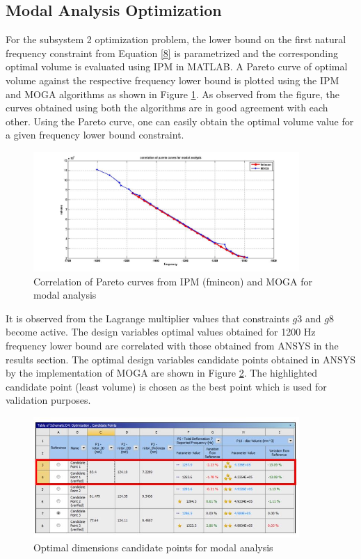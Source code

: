 \documentclass[12pt]{article}
\begin{document}
\subsection{Modal Analysis Optimization}
For the subsystem 2 optimization problem, the lower bound on the first natural frequency constraint from Equation \ref{8} is parametrized and the corresponding optimal volume is evaluated using IPM in MATLAB. A Pareto curve of optimal volume against the respective frequency lower bound is plotted using the IPM and MOGA algorithms as shown in Figure \ref{fig3}. As observed from the figure, the curves obtained using both the algorithms are in good agreement with each other. Using the Pareto curve, one can easily obtain the optimal volume value for a given frequency lower bound constraint. 
\begin{figure}[H]
\begin{center}
\includegraphics[width=0.9\textwidth]{modal_pareto.jpg}
\caption{Correlation of Pareto curves from IPM (fmincon) and MOGA for modal analysis}
\label{fig3}
\end{center}
\end{figure}
It is observed from the Lagrange multiplier values that constraints $g3$ and $g8$ become active. The design variables optimal values obtained for 1200 Hz frequency lower bound are correlated with those obtained from ANSYS in the results section. The optimal design variables candidate points obtained in ANSYS by the implementation of MOGA are shown in Figure \ref{cn}. The highlighted candidate point (least volume) is chosen as the best point which is used for validation purposes.
\begin{figure}[H]
\begin{center}
\includegraphics[width=0.9\textwidth]{cn.jpg}
\caption{Optimal dimensions candidate points for modal analysis}
\label{cn}
\end{center}
\end{figure}
\end{document}
